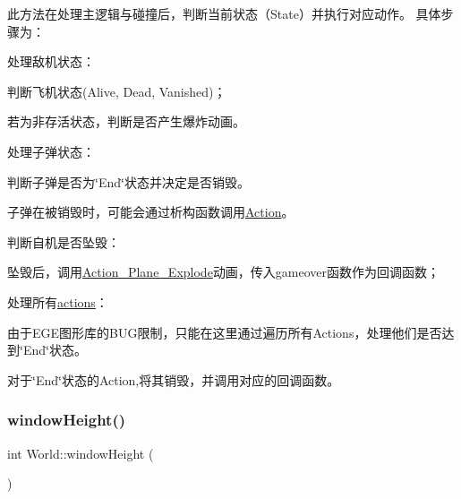 此方法在处理主逻辑与碰撞后，判断当前状态（\+State）并执行对应动作。 具体步骤为：
\begin{DoxyEnumerate}
\item 处理敌机状态：
\begin{DoxyItemize}
\item 判断飞机状态(\+Alive, Dead, Vanished)；
\item 若为非存活状态，判断是否产生爆炸动画。
\end{DoxyItemize}
\item 处理子弹状态：
\begin{DoxyItemize}
\item 判断子弹是否为\char`\"{}\+End\char`\"{}状态并决定是否销毁。
\item 子弹在被销毁时，可能会通过析构函数调用\hyperlink{class_action}{Action}。
\end{DoxyItemize}
\item 判断自机是否坠毁：
\begin{DoxyItemize}
\item 坠毁后，调用\hyperlink{class_action___plane___explode}{Action\+\_\+\+Plane\+\_\+\+Explode}动画，传入gameover函数作为回调函数；
\end{DoxyItemize}
\item 处理所有\hyperlink{class_world_aefe8e0e9e418bbf81671314bf8d019f2}{actions}：
\begin{DoxyItemize}
\item 由于\+E\+G\+E图形库的\+B\+U\+G限制，只能在这里通过遍历所有\+Actions，处理他们是否达到\char`\"{}\+End\char`\"{}状态。
\item 对于\char`\"{}\+End\char`\"{}状态的\+Action,将其销毁，并调用对应的回调函数。 
\end{DoxyItemize}
\end{DoxyEnumerate}\mbox{\label{class_world_a1be83eac68417720386d6f04406675e2}} 
\subsubsection{\texorpdfstring{window\+Height()}{windowHeight()}}
{\footnotesize\ttfamily int World\+::window\+Height (\begin{DoxyParamCaption}{ }\end{DoxyParamCaption})\hspace{0.3cm}{\ttfamily [inline]}}



